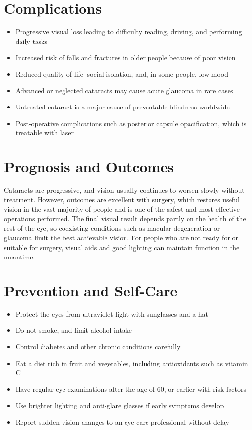 \section*{Complications}
\begin{itemize}
    \item Progressive visual loss leading to difficulty reading, driving, and performing daily tasks
    \item Increased risk of falls and fractures in older people because of poor vision
    \item Reduced quality of life, social isolation, and, in some people, low mood
    \item Advanced or neglected cataracts may cause acute glaucoma in rare cases
    \item Untreated cataract is a major cause of preventable blindness worldwide
    \item Post-operative complications such as posterior capsule opacification, which is treatable with laser
\end{itemize}

\section*{Prognosis and Outcomes}
Cataracts are progressive, and vision usually continues to worsen slowly without treatment. However, outcomes are excellent with surgery, which restores useful vision in the vast majority of people and is one of the safest and most effective operations performed. The final visual result depends partly on the health of the rest of the eye, so coexisting conditions such as macular degeneration or glaucoma limit the best achievable vision. For people who are not ready for or suitable for surgery, visual aids and good lighting can maintain function in the meantime.

\section*{Prevention and Self-Care}
\begin{itemize}
    \item Protect the eyes from ultraviolet light with sunglasses and a hat
    \item Do not smoke, and limit alcohol intake
    \item Control diabetes and other chronic conditions carefully
    \item Eat a diet rich in fruit and vegetables, including antioxidants such as vitamin C
    \item Have regular eye examinations after the age of 60, or earlier with risk factors
    \item Use brighter lighting and anti-glare glasses if early symptoms develop
    \item Report sudden vision changes to an eye care professional without delay
\end{itemize}

